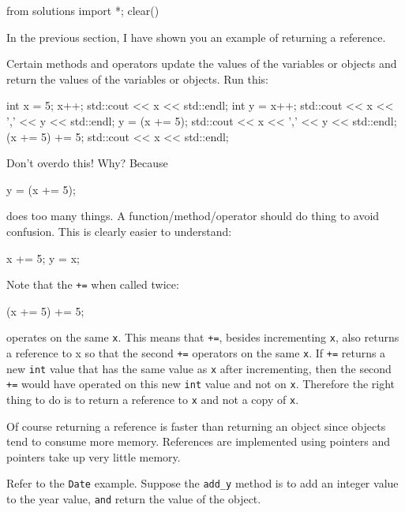 \begin{python0}
from solutions import *; clear()
\end{python0}

In the previous section, I have shown you an example of returning a
reference.

Certain methods and operators update the values of the variables or
objects and return the values of the variables or objects. Run this:

\begin{consolethree}[escapeinside=||]
int x = 5;
x++;
std::cout << x << std::endl;
int y = x++;
std::cout << x << ',' << y << std::endl;
y = (x += 5);
std::cout << x << ',' << y << std::endl;
(x += 5) += 5;
std::cout << x << std::endl;
\end{consolethree}

Don't overdo this! Why? Because

\begin{consolethree}[escapeinside=||]
y = (x += 5);
\end{consolethree}

does too many things. A function/method/operator should do
 thing to avoid confusion. This is clearly easier to
understand:

\begin{consolethree}[escapeinside=||]
x += 5;
y = x;
\end{consolethree}

Note that the \texttt{+=} when called twice:

\begin{consolethree}[escapeinside=||]
(x += 5) += 5;
\end{consolethree}

operates on the same \texttt{x}. This means that \texttt{+=}, besides
incrementing \texttt{x}, also returns a reference to x so that the second
\texttt{+=} operators on the same \texttt{x}. If \texttt{+=} returns a new
\texttt{int} value that has the same value as \texttt{x} after incrementing,
then the second \texttt{+=} would have operated on this new \texttt{int}
value and not on \texttt{x}. Therefore the right thing to do is to return
a reference to \texttt{x} and not a copy of \texttt{x}.

Of course returning a reference is faster than returning an object since
objects tend to consume more memory. References are implemented using
pointers and pointers take up very little memory.

Refer to the \texttt{Date} example. Suppose the \texttt{add\_y} method is to
add an integer value to the year value, \texttt{and} return the value of
the object.

